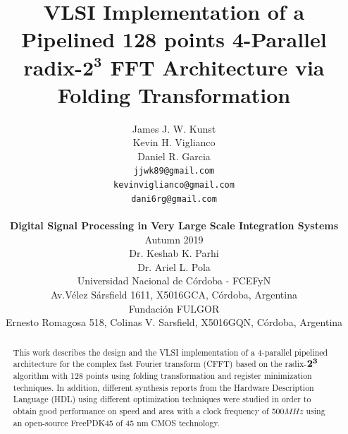 \documentclass[10pt,times,mathptm,psfig,final,journal,comsoc]{IEEEtran}
\begin{document}
\title{
\huge \bf VLSI Implementation of a Pipelined 128 points 4-Parallel radix-$\mathbf{2^3}$ FFT Architecture via Folding Transformation\\
}
\author{
\begin{minipage}{0.4\linewidth}
	\raggedleft
	James J. W. Kunst\\
	Kevin H. Viglianco\\
	Daniel R. Garcia
\end{minipage}
\begin{minipage}{0.4\linewidth}
	\raggedright	
	{\tt\small jjwk89@gmail.com}\\
	{\tt\small kevinviglianco@gmail.com}\\	
	{\tt\small dani6rg@gmail.com}			
\end{minipage}			
\\		
[0.5cm]
{\large \bf Digital Signal Processing in Very Large Scale Integration Systems}\\
[0.5cm]
Autumn 2019\\
[0.5cm]
Dr. Keshab K. Parhi	\\
Dr. Ariel L. Pola	\\
[0.5cm]
Universidad Nacional de Córdoba - FCEFyN\\
Av.Vélez Sársfield 1611, X5016GCA, C\'ordoba, Argentina\\
[0.5cm]
Fundación FULGOR\\
Ernesto Romagosa 518, Colinas V. Sarsfield, X5016GQN, Córdoba, Argentina%
}
\maketitle



\begin{abstract} 
This work describes the design and the VLSI implementation of a 4-parallel pipelined architecture for the complex fast Fourier transform (CFFT) based on the radix-$\bf 2^3$ algorithm with 128 points using folding transformation and register minimization techniques. In addition, different synthesis reports from the Hardware Description Language (HDL) using different optimization techniques were studied in order to obtain good performance on speed and area with a clock frequency of 500$MHz$ using an open-source FreePDK45 of 45 nm CMOS technology.
\end{abstract}



\end{document}
